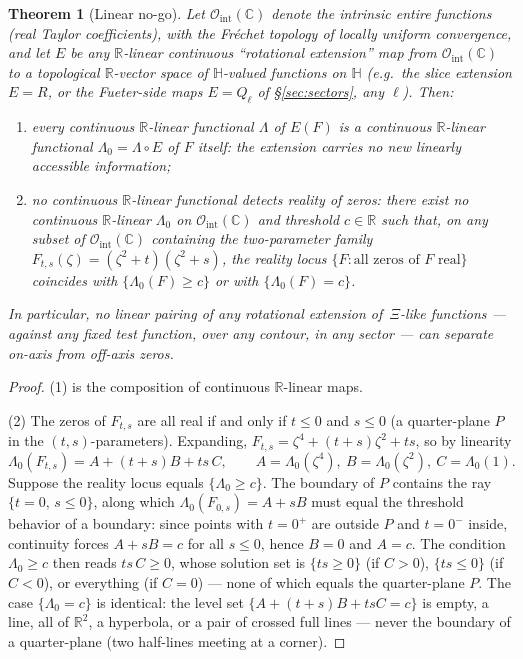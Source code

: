 \documentclass[11pt]{amsart}
\theoremstyle{plain}
\newtheorem{mainthm}{Theorem}
\theoremstyle{definition}
\theoremstyle{remark}
\newcommand{\HH}{\mathbb{H}}
\newcommand{\CC}{\mathbb{C}}
\newcommand{\RR}{\mathbb{R}}
\begin{document}
\begin{mainthm}[Linear no-go]\label{thm:linear-nogo}
Let $\mathcal O_{\mathrm{int}}(\CC)$ denote the intrinsic entire functions (real Taylor
coefficients), with the Fr\'echet topology of locally uniform convergence, and let $E$ be any
$\RR$-linear continuous ``rotational extension'' map from $\mathcal O_{\mathrm{int}}(\CC)$ to a
topological $\RR$-vector space of $\HH$-valued functions on $\HH$ (e.g.\ the slice extension
$E=R$, or the Fueter-side maps $E=Q_\ell$ of \S\ref{sec:sectors}, any $\ell$). Then:
\begin{enumerate}
\item every continuous $\RR$-linear functional $\Lambda$ of $E(F)$ is a continuous
$\RR$-linear functional $\Lambda_0=\Lambda\circ E$ of $F$ itself: the extension carries no new
linearly accessible information;
\item no continuous $\RR$-linear functional detects reality of zeros: there exist no continuous
$\RR$-linear $\Lambda_0$ on $\mathcal O_{\mathrm{int}}(\CC)$ and threshold $c\in\RR$ such that,
on any subset of $\mathcal O_{\mathrm{int}}(\CC)$ containing the two-parameter family
$F_{t,s}(\zeta)=(\zeta^2+t)(\zeta^2+s)$, the reality locus
$\{F:\text{all zeros of }F\text{ real}\}$ coincides with $\{\Lambda_0(F)\ge c\}$ or with
$\{\Lambda_0(F)=c\}$.
\end{enumerate}
In particular, no linear pairing of any rotational extension of\, $\Xi$-like functions ---
against any fixed test function, over any contour, in any sector --- can separate on-axis from
off-axis zeros.
\end{mainthm}

\begin{proof}
(1) is the composition of continuous $\RR$-linear maps.

(2) The zeros of $F_{t,s}$ are all real if and only if $t\le0$ and $s\le0$ (a quarter-plane
$P$ in the $(t,s)$-parameters). Expanding,
$F_{t,s}=\zeta^4+(t+s)\zeta^2+ts$, so by linearity
\[
\Lambda_0(F_{t,s})=A+(t+s)B+ts\,C,\qquad
A=\Lambda_0(\zeta^4),\ B=\Lambda_0(\zeta^2),\ C=\Lambda_0(1).
\]
Suppose the reality locus equals $\{\Lambda_0\ge c\}$. The boundary of $P$ contains the ray
$\{t=0,\,s\le0\}$, along which $\Lambda_0(F_{0,s})=A+sB$ must equal the threshold behavior of a
boundary: since points with $t=0^+$ are outside $P$ and $t=0^-$ inside, continuity forces
$A+sB=c$ for all $s\le0$, hence $B=0$ and $A=c$. The condition $\Lambda_0\ge c$ then reads
$ts\,C\ge0$, whose solution set is $\{ts\ge0\}$ (if $C>0$), $\{ts\le0\}$ (if $C<0$), or
everything (if $C=0$) --- none of which equals the quarter-plane $P$. The case
$\{\Lambda_0=c\}$ is identical: the level set $\{A+(t+s)B+tsC=c\}$ is empty, a line, all of
$\RR^2$, a hyperbola, or a pair of crossed full lines --- never the boundary of a quarter-plane
(two half-lines meeting at a corner).
\end{proof}
\end{document}
